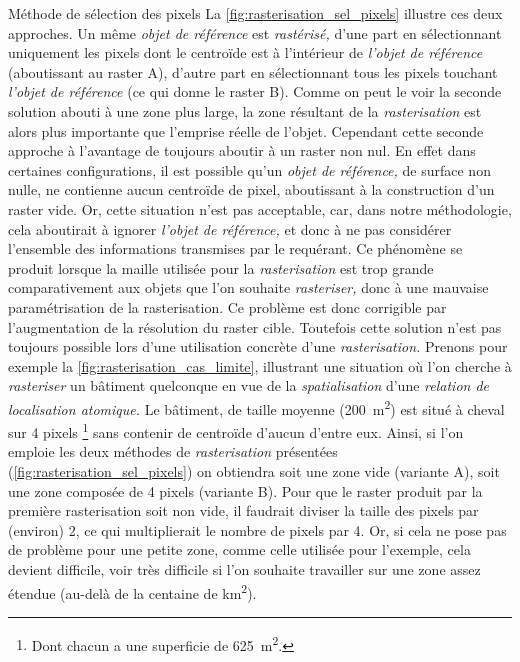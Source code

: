 Méthode de sélection des pixels
%
La \autoref{fig:rasterisation_sel_pixels} illustre ces deux approches. Un même \emph{objet de référence} est \emph{rastérisé,} d'une part en sélectionnant uniquement les pixels dont le centroïde est à l'intérieur de \emph{l'objet de référence} (aboutissant au raster \textcolor{RdBu-9-1}{\textsf{A}}), d'autre part en sélectionnant tous les pixels touchant \emph{l'objet de référence} (ce qui donne le raster \textcolor{RdBu-9-9}{\textsf{B}}). Comme on peut le voir la seconde solution abouti à une zone plus large, la zone résultant de la \emph{rasterisation} est alors plus importante que l'emprise réelle de l'objet. Cependant cette seconde approche à l'avantage de toujours aboutir à un raster non nul. En effet dans certaines configurations, il est possible qu'un \emph{objet de référence,} de surface non nulle, ne contienne aucun centroïde de pixel, aboutissant à la construction d'un raster vide. Or, cette situation n'est pas acceptable, car, dans notre méthodologie, cela aboutirait à ignorer \emph{l'objet de référence,} et donc à ne pas considérer l'ensemble des informations transmises par le requérant. Ce phénomène se produit lorsque la maille utilisée pour la \emph{rasterisation} est trop grande comparativement aux objets que l'on souhaite \emph{rasteriser,} donc à une mauvaise paramétrisation de la rasterisation. Ce problème est donc corrigible par l'augmentation de la résolution du raster cible. Toutefois cette solution n'est pas toujours possible lors d'une utilisation concrète d'une \emph{rasterisation.} Prenons pour exemple la \autoref{fig:rasterisation_cas_limite}, illustrant une situation où l'on cherche à \emph{rasteriser} un bâtiment quelconque en vue de la \emph{spatialisation} d'une \emph{relation de localisation atomique.} Le bâtiment, de taille moyenne (\ie \SI{200}{\metre\squared}) est situé à cheval sur 4 pixels \footnote{Dont chacun a une superficie de \SI{625}{\metre\squared}.} sans contenir de centroïde d'aucun d'entre eux. Ainsi, si l'on emploie les deux méthodes de \emph{rasterisation} présentées (\autoref{fig:rasterisation_sel_pixels}) on obtiendra soit une zone vide (variante \textcolor{RdBu-9-1}{\textsf{A}}), soit une zone composée de 4 pixels (variante \textcolor{RdBu-9-9}{\textsf{B}}). Pour que le raster produit par la première rasterisation soit non vide, il faudrait diviser la taille des pixels par (environ) 2, ce qui multiplierait le nombre de pixels par 4. Or, si cela ne pose pas de problème pour une petite zone, comme celle utilisée pour l'exemple, cela devient difficile, voir très difficile si l'on souhaite travailler sur une zone assez étendue (au-delà de la centaine de \si{\kilo\meter\squared}).

